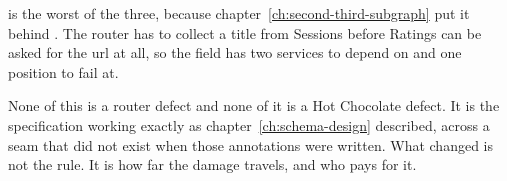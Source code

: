 %
 is the worst of the three, because
chapter~\ref{ch:second-third-subgraph} put it behind . The
router has to collect a title from Sessions before Ratings can be asked for the
url at all, so the field has two services to depend on and one position to fail
at.

%
None of this is a router defect and none of it is a Hot Chocolate defect. It is
the specification working exactly as chapter~\ref{ch:schema-design} described,
across a seam that did not exist when those annotations were written. What
changed is not the rule. It is how far the damage travels, and who pays for it.
